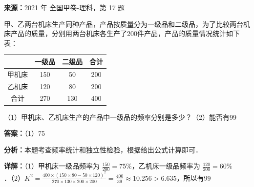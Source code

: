\begin{question}[points=12]
\textbf{来源：}2021 年 全国甲卷-理科，第 17 题\par
甲、乙两台机床生产同种产品，产品按质量分为一级品和二级品，为了比较两台机床产品的质量，分别用两台机床各生产了200件产品，产品的质量情况统计如下表：\begin{tabular}{|c|c|c|c|} \hline & 一级品 & 二级品 & 合计 \\ \hline 甲机床 & 150 & 50 & 200 \\ \hline 乙机床 & 120 & 80 & 200 \\ \hline 合计 & 270 & 130 & 400 \\ \hline \end{tabular}（1）甲机床、乙机床生产的产品中一级品的频率分别是多少？（2）能否有99%
\begin{solution}
\textbf{答案：}（1）75%

\textbf{分析：}本题考查频率统计和独立性检验，根据给出公式计算即可．

\textbf{详解：}（1）甲机床一级品频率为 $\frac{150}{200}=75\%$，乙机床一级品频率为 $\frac{120}{200}=60\%$．（2）$K^2 = \frac{400\times(150\times80-50\times120)^2}{270\times130\times200\times200} = \frac{400}{39} \approx 10.256 > 6.635$，所以有99%
\end{solution}
\end{question}

